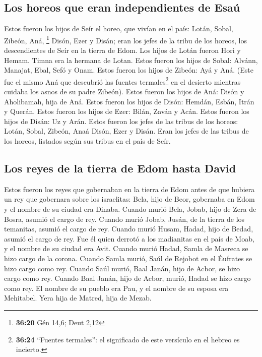 \hypertarget{los-horeos-que-eran-independientes-de-esauxfa}{%
\subsection{Los horeos que eran independientes de
Esaú}\label{los-horeos-que-eran-independientes-de-esauxfa}}

 Estos fueron los hijos de Seír el horeo, que vivían en
el país: Lotán, Sobal, Zibeón, Aná, \footnote{\textbf{36:20} Gén 14,6;
  Deut 2,12}  Disón, Ezer y Disán; eran los jefes de la
tribu de los horeos, los descendientes de Seír en la tierra de Edom.
 Los hijos de Lotán fueron Hori y Hemam. Timna era la
hermana de Lotan.  Estos fueron los hijos de Sobal:
Alvánn, Manajat, Ebal, Sefó y Onam.  Estos fueron los
hijos de Zibeón: Ayá y Aná. (Este fue el mismo Aná que descubrió las
fuentes termales\footnote{\textbf{36:24} ``Fuentes termales'': el
  significado de este versículo en el hebreo es incierto.} en el
desierto mientras cuidaba los asnos de su padre Zibeón). 
Estos fueron los hijos de Aná: Disón y Aholibamah, hija de Aná.
 Estos fueron los hijos de Disón: Hemdán, Esbán, Itrán y
Querán.  Estos fueron los hijos de Ezer: Bilán, Zaván y
Acán.  Estos fueron los hijos de Disán: Uz y Arán.
 Estos fueron los jefes de las tribus de los horeos:
Lotán, Sobal, Zibeón, Anaá  Disón, Ezer y Disán. Eran los
jefes de las tribus de los horeos, listados según sus tribus en el país
de Seír.

\hypertarget{los-reyes-de-la-tierra-de-edom-hasta-david}{%
\subsection{Los reyes de la tierra de Edom hasta
David}\label{los-reyes-de-la-tierra-de-edom-hasta-david}}

 Estos fueron los reyes que gobernaban en la tierra de
Edom antes de que hubiera un rey que gobernara sobre los israelitas:
 Bela, hijo de Beor, gobernaba en Edom y el nombre de su
ciudad era Dinaba.  Cuando murió Bela, Jobab, hijo de
Zera de Bosra, asumió el cargo de rey.  Cuando murió
Jobab, Jusán, de la tierra de los temanitas, asumió el cargo de rey.
 Cuando murió Husam, Hadad, hijo de Bedad, asumió el
cargo de rey. Fue él quien derrotó a los madianitas en el país de Moab,
y el nombre de su ciudad era Avit.  Cuando murió Hadad,
Samla de Masreca se hizo cargo de la corona.  Cuando
Samla murió, Saúl de Rejobot en el Éufrates se hizo cargo como rey.
 Cuando Saúl murió, Baal Janán, hijo de Acbor, se hizo
cargo como rey.  Cuando Baal Janán, hijo de Acbor, murió,
Hadad se hizo cargo como rey. El nombre de su pueblo era Pau, y el
nombre de su esposa era Mehitabel. Yera hija de Matred, hija de Mezab.

